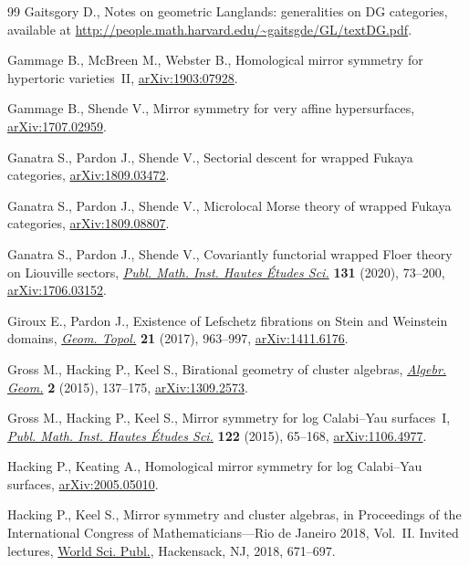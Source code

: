 \documentclass[pdftex]{sigma}%
\numberwithin{equation}{section}
\begin{document}
\begin{thebibliography}{99}
Gaitsgory D., Notes on geometric {L}anglands: generalities on {DG} categories,
 available at \url{http://people.math.harvard.edu/~gaitsgde/GL/textDG.pdf}.

Gammage B., McBreen M., Webster B., Homological mirror symmetry for hypertoric
 varieties~{II}, \href{https://arxiv.org/abs/1903:07928}{arXiv:1903:07928}.

Gammage B., Shende V., Mirror symmetry for very affine hypersurfaces,
 \href{https://arxiv.org/abs/1707.02959}{arXiv:1707.02959}.

Ganatra S., Pardon J., Shende V., Sectorial descent for wrapped {F}ukaya
 categories, \href{https://arxiv.org/abs/1809.03472}{arXiv:1809.03472}.

Ganatra S., Pardon J., Shende V., Microlocal {M}orse theory of wrapped {Fukaya}
 categories, \href{https://arxiv.org/abs/1809.08807}{arXiv:1809.08807}.

Ganatra S., Pardon J., Shende V., Covariantly functorial wrapped {F}loer theory
 on {L}iouville sectors, \href{https://doi.org/10.1007/s10240-019-00112-x}{\textit{Publ. Math. Inst. Hautes \'Etudes Sci.}}
 \textbf{131} (2020), 73--200, \href{https://arxiv.org/abs/1706.03152}{arXiv:1706.03152}.


Giroux E., Pardon J., Existence of {L}efschetz fibrations on {S}tein and
 {W}einstein domains, \href{https://doi.org/10.2140/gt.2017.21.963}{\textit{Geom. Topol.}} \textbf{21} (2017), 963--997,
 \href{https://arxiv.org/abs/1411.6176}{arXiv:1411.6176}.

Gross M., Hacking P., Keel S., Birational geometry of cluster algebras,
 \href{https://doi.org/10.14231/AG-2015-007}{\textit{Algebr. Geom.}} \textbf{2} (2015), 137--175, \href{https://arxiv.org/abs/1309.2573}{arXiv:1309.2573}.

Gross M., Hacking P., Keel S., Mirror symmetry for log {C}alabi--{Y}au
 surfaces~{I}, \href{https://doi.org/10.1007/s10240-015-0073-1}{\textit{Publ. Math. Inst. Hautes \'Etudes Sci.}} \textbf{122}
 (2015), 65--168, \href{https://arxiv.org/abs/1106.4977}{arXiv:1106.4977}.

Hacking P., Keating A., Homological mirror symmetry for log {C}alabi--{Y}au
 surfaces, \href{https://arxiv.org/abs/2005.05010}{arXiv:2005.05010}.

Hacking P., Keel S., Mirror symmetry and cluster algebras, in Proceedings of
 the {I}nternational {C}ongress of {M}athematicians---{R}io de {J}aneiro 2018,
 {V}ol.~{II}. {I}nvited lectures, \href{https://doi.org/10.1142/11060}{World Sci. Publ.}, Hackensack, NJ, 2018,
 671--697.


\end{thebibliography}
\end{document}
